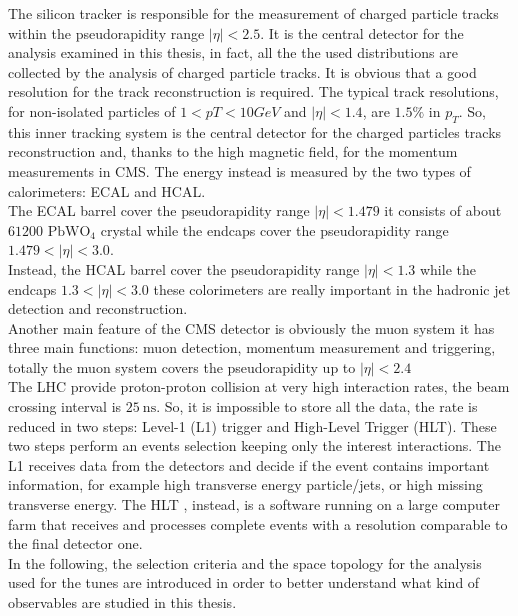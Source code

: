 \noindent The silicon tracker is responsible for the measurement of charged particle tracks within the pseudorapidity
range $|\eta| < 2.5$. It is the central detector for the analysis examined in this thesis, in fact, all the the used distributions are collected by the analysis of charged particle tracks. It is obvious that a good resolution for the track reconstruction is required. The typical track resolutions, for non-isolated particles of $1 < pT < 10 GeV$ and $|\eta| < 1.4$, are $1.5\%$ in $p_T$. So, this inner tracking system is the central detector for the charged particles tracks reconstruction and, thanks to the high magnetic field, for the momentum measurements in CMS. The energy instead is measured by the two types of calorimeters: ECAL and HCAL.
\\   
The ECAL barrel cover the pseudorapidity range $|\eta|<1.479$ it consists of about $61200$ $\mathrm{PbWO}_4$ crystal while the endcaps cover the pseudorapidity range $1.479<|\eta|<3.0$. 
\\
Instead, the HCAL barrel cover the pseudorapidity range $|\eta|<1.3$ while the endcaps $1.3<|\eta|<3.0$ these colorimeters are really important in the hadronic jet detection and reconstruction. 
\\
Another main feature of the CMS detector is obviously the muon system it has three main functions: muon detection, momentum measurement and triggering, totally the muon system covers the pseudorapidity up to $|\eta|<2.4$
\\
The LHC provide proton-proton collision at very high interaction rates, the beam crossing interval is $25\ \mathrm{ns}$. So, it is impossible to store all the data, the rate is reduced in two steps: Level-1 (L1) trigger and High-Level Trigger (HLT).
These two steps perform an events selection keeping only the interest interactions.
The L1 receives data from the detectors and decide if the event contains important information, for example high transverse energy particle/jets, or high missing transverse energy.
The HLT , instead, is a software running on a large computer farm that receives and processes complete events with a resolution comparable to the final detector one.
\\
In the following, the selection criteria and the space topology for the analysis used for the tunes are introduced in order to better understand what kind of observables are studied in this thesis.

